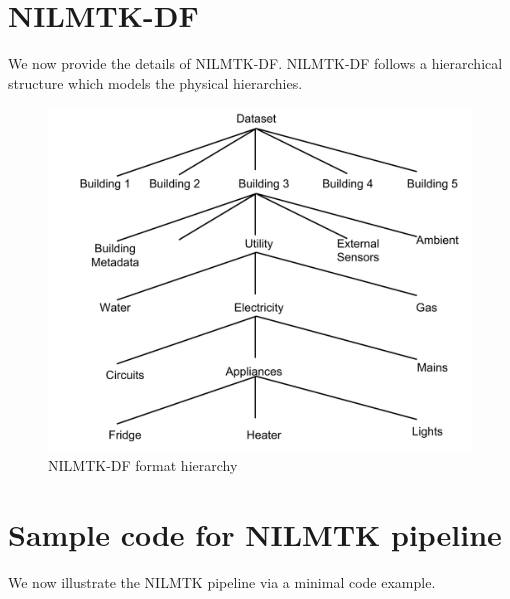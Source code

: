 \documentclass{sig-alternate}
\begin{document}

{\scriptsize
}

\newpage
\appendix
\section{NILMTK-DF}
\label{app:appendix_data_format}
We now provide the details of NILMTK-DF. NILMTK-DF follows a hierarchical structure which models the physical hierarchies. 

\begin{figure}
\centering 
\includegraphics[scale=0.5]{figures/data_format.pdf}
\caption{NILMTK-DF format hierarchy}
\label{fig:nilmtk-format}
\end{figure}

\section{Sample code for NILMTK pipeline}
\label{app:appendix_pipeline}
We now illustrate the NILMTK pipeline via a minimal code example.
\end{document}
